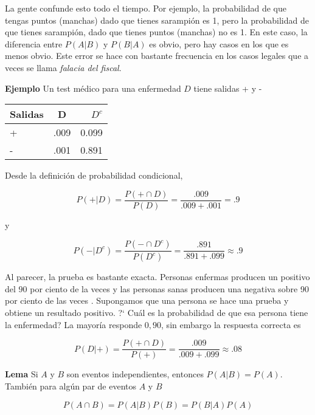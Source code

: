 \documentclass{article}\usepackage[]{graphicx}\usepackage[]{color}
\begin{document}
\vspace{0.2cm}

La gente  confunde esto todo el tiempo. Por ejemplo, la probabilidad de que tengas puntos (manchas)  dado que tienes  sarampi\'on es 1, pero la probabilidad de que tienes  sarampi\'on, dado que  tienes puntos (manchas) no es 1. En este caso, la diferencia entre $P(A|B)$  y $P(B|A)$ es obvio, pero hay casos en los que es menos obvio. Este error se hace con bastante frecuencia en los casos legales que a veces se llama \textit{falacia del fiscal}.


\vspace{0.5cm}

\textbf{Ejemplo} Un test m\'edico para una enfermedad $D$ tiene salidas + y -

\vspace{0.3cm}

\begin{tabular}{l|c  r}
   Salidas           & D & $D^{c}$  \\
\hline
+       & .009 & 0.099   \\
-       & .001 & 0.891   \\
\end{tabular}

\vspace{0.2cm}

Desde la definici\'on de probabilidad  condicional,

\[
P(+| D) = \frac{P(+ \cap D)}{P(D)} = \frac{.009}{.009 + .001} = .9
\]

y


\[
P(-| D^{c}) = \frac{P(- \cap D^{c})}{P(D^{c})} = \frac{.891}{.891 + .099} \approx .9
\]


Al parecer, la prueba es bastante exacta. Personas enfermas producen un positivo del $90$ por ciento de la veces y las personas sanas producen una negativa sobre 90 por ciento de las veces . Supongamos que una persona se  hace  una prueba y obtiene un resultado positivo. ?` Cu\'al es la probabilidad de que esa persona  tiene la enfermedad? La mayor\'ia responde  $0,90$, sin embargo la  respuesta correcta es

\[
P(D| +) = \frac{P(+ \cap D)}{P(+)} = \frac{.009}{.009 + .099} \approx .08
\]


\vspace{0.3cm}

\textbf{Lema} Si $A$ y $B$ son eventos independientes, entonces $P(A|B) = P(A)$. Tambi\'en para alg\'un par de eventos $A$ y $B$

\[
P(A \cap B) = P(A|B)P(B) = P(B|A)P(A)
\]
\end{document}

